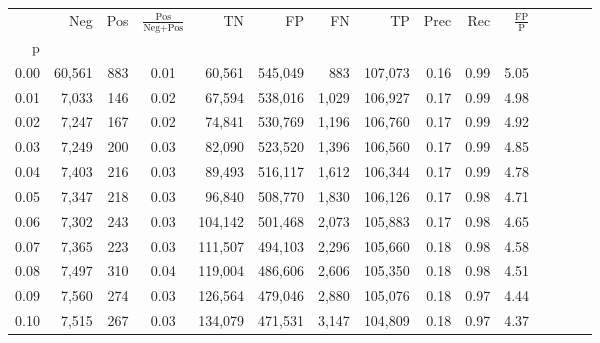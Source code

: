 \begin{tabular}{rrrcrrrrrrrrrrr}
\toprule
{} &     Neg &     Pos & $\frac{\text{Pos}}{\text{Neg}+\text{Pos}}$ &       TN &       FP &       FN &       TP &  Prec &   Rec & $\frac{\text{FP}}{\text{P}}$ \\
p    &         &         &                                            &          &          &          &          &       &       &                              \\
\midrule
0.00 &  60,561 &     883 &                                       0.01 &   60,561 &  545,049 &      883 &  107,073 &  0.16 &  0.99 &                         5.05 \\
0.01 &   7,033 &     146 &                                       0.02 &   67,594 &  538,016 &    1,029 &  106,927 &  0.17 &  0.99 &                         4.98 \\
0.02 &   7,247 &     167 &                                       0.02 &   74,841 &  530,769 &    1,196 &  106,760 &  0.17 &  0.99 &                         4.92 \\
0.03 &   7,249 &     200 &                                       0.03 &   82,090 &  523,520 &    1,396 &  106,560 &  0.17 &  0.99 &                         4.85 \\
0.04 &   7,403 &     216 &                                       0.03 &   89,493 &  516,117 &    1,612 &  106,344 &  0.17 &  0.99 &                         4.78 \\
0.05 &   7,347 &     218 &                                       0.03 &   96,840 &  508,770 &    1,830 &  106,126 &  0.17 &  0.98 &                         4.71 \\
0.06 &   7,302 &     243 &                                       0.03 &  104,142 &  501,468 &    2,073 &  105,883 &  0.17 &  0.98 &                         4.65 \\
0.07 &   7,365 &     223 &                                       0.03 &  111,507 &  494,103 &    2,296 &  105,660 &  0.18 &  0.98 &                         4.58 \\
0.08 &   7,497 &     310 &                                       0.04 &  119,004 &  486,606 &    2,606 &  105,350 &  0.18 &  0.98 &                         4.51 \\
0.09 &   7,560 &     274 &                                       0.03 &  126,564 &  479,046 &    2,880 &  105,076 &  0.18 &  0.97 &                         4.44 \\
0.10 &   7,515 &     267 &                                       0.03 &  134,079 &  471,531 &    3,147 &  104,809 &  0.18 &  0.97 &                         4.37 \\

\end{tabular}
